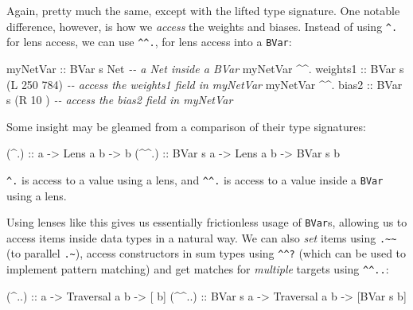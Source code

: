 \documentclass[]{article}
\newenvironment{Shaded}{}{}
\newcommand{\CommentTok}[1]{\textcolor[rgb]{0.38,0.63,0.69}{\textit{#1}}}
\newcommand{\DataTypeTok}[1]{\textcolor[rgb]{0.56,0.13,0.00}{#1}}
\newcommand{\DecValTok}[1]{\textcolor[rgb]{0.25,0.63,0.44}{#1}}
\newcommand{\NormalTok}[1]{#1}
\newcommand{\OperatorTok}[1]{\textcolor[rgb]{0.40,0.40,0.40}{#1}}
\newcommand{\OtherTok}[1]{\textcolor[rgb]{0.00,0.44,0.13}{#1}}
\begin{document}
Again, pretty much the same, except with the lifted type signature. One notable
difference, however, is how we \emph{access} the weights and biases. Instead of
using \texttt{\^{}.} for lens access, we can use \texttt{\^{}\^{}.}, for lens
access into a \texttt{BVar}:

\begin{Shaded}
\begin{Highlighting}[]
\OtherTok{myNetVar                ::} \DataTypeTok{BVar}\NormalTok{ s }\DataTypeTok{Net}          \CommentTok{{-}{-} a Net inside a BVar}
\NormalTok{myNetVar }\OperatorTok{\^{}\^{}.}\OtherTok{ weights1   ::} \DataTypeTok{BVar}\NormalTok{ s (}\DataTypeTok{L} \DecValTok{250} \DecValTok{784}\NormalTok{)  }\CommentTok{{-}{-} access the weights1 field in myNetVar}
\NormalTok{myNetVar }\OperatorTok{\^{}\^{}.}\OtherTok{ bias2      ::} \DataTypeTok{BVar}\NormalTok{ s (}\DataTypeTok{R}  \DecValTok{10}\NormalTok{    )  }\CommentTok{{-}{-} access the bias2 field in myNetVar}
\end{Highlighting}
\end{Shaded}

Some insight may be gleamed from a comparison of their type signatures:

\begin{Shaded}
\begin{Highlighting}[]
\OtherTok{(\^{}.)  ::}\NormalTok{        a }\OtherTok{{-}\textgreater{}} \DataTypeTok{Lens\textquotesingle{}}\NormalTok{ a b }\OtherTok{{-}\textgreater{}}\NormalTok{        b}
\OtherTok{(\^{}\^{}.) ::} \DataTypeTok{BVar}\NormalTok{ s a }\OtherTok{{-}\textgreater{}} \DataTypeTok{Lens\textquotesingle{}}\NormalTok{ a b }\OtherTok{{-}\textgreater{}} \DataTypeTok{BVar}\NormalTok{ s b}
\end{Highlighting}
\end{Shaded}

\texttt{\^{}.} is access to a value using a lens, and \texttt{\^{}\^{}.} is
access to a value inside a \texttt{BVar} using a lens.

Using lenses like this gives us essentially frictionless usage of
\texttt{BVar}s, allowing us to access items inside data types in a natural way.
We can also \emph{set} items using \texttt{.\textasciitilde{}\textasciitilde{}}
(to parallel \texttt{.\textasciitilde{}}), access constructors in sum types
using \texttt{\^{}\^{}?} (which can be used to implement pattern matching) and
get matches for \emph{multiple} targets using \texttt{\^{}\^{}..}:

\begin{Shaded}
\begin{Highlighting}[]
\OtherTok{(\^{}..)  ::}\NormalTok{        a }\OtherTok{{-}\textgreater{}} \DataTypeTok{Traversal\textquotesingle{}}\NormalTok{ a b }\OtherTok{{-}\textgreater{}}\NormalTok{ [       b]}
\OtherTok{(\^{}\^{}..) ::} \DataTypeTok{BVar}\NormalTok{ s a }\OtherTok{{-}\textgreater{}} \DataTypeTok{Traversal\textquotesingle{}}\NormalTok{ a b }\OtherTok{{-}\textgreater{}}\NormalTok{ [}\DataTypeTok{BVar}\NormalTok{ s b]}
\end{Highlighting}
\end{Shaded}
\end{document}
